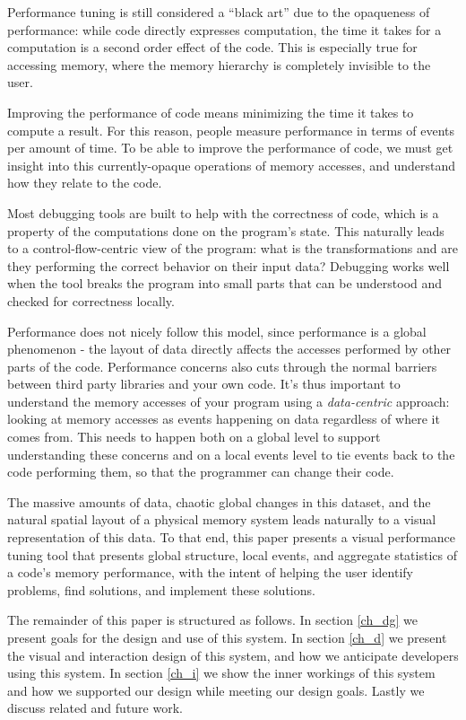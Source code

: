 \documentclass[annual]{acmsiggraph}
\begin{document}
  Performance tuning is still considered a ``black art'' due to the opaqueness of performance: while code directly expresses computation, the time it takes for a computation is a second order effect of the code. This is especially true for accessing memory, where the memory hierarchy is completely invisible to the user.
  
  Improving the performance of code means minimizing the time it takes to compute a result. For this reason, people measure performance in terms of events per amount of time. To be able to improve the performance of code, we must get insight into this currently-opaque operations of memory accesses, and understand how they relate to the code.
  
  Most debugging tools are built to help with the correctness of code, which is a property of the computations done on the program's state. This naturally leads to a control-flow-centric view of the program: what is the transformations and are they performing the correct behavior on their input data? Debugging works well when the tool breaks the program into small parts that can be understood and checked for correctness locally.
  
  Performance does not nicely follow this model, since performance is a global phenomenon - the layout of data directly affects the accesses performed by other parts of the code. Performance concerns also cuts through the normal barriers between third party libraries and your own code. It's thus important to understand the memory accesses of your program using a \emph{data-centric} approach: looking at memory accesses as events happening on data regardless of where it comes from. This needs to happen both on a global level to support understanding these concerns and on a local events level to tie events back to the code performing them, so that the programmer can change their code.
    
  The massive amounts of data, chaotic global changes in this dataset, and the natural spatial layout of a physical memory system leads naturally to a visual representation of this data. To that end, this paper presents a visual performance tuning tool that presents global structure, local events, and aggregate statistics of a code's memory performance, with the intent of helping the user identify problems, find solutions, and implement these solutions. 
  
  The remainder of this paper is structured as follows. In section \ref{ch_dg} we present goals for the design and use of this system. In section \ref{ch_d} we present the visual and interaction design of this system, and how we anticipate developers using this system. In section \ref{ch_i} we show the inner workings of this system and how we supported our design while meeting our design goals. Lastly we discuss related and future work.
    
\end{document}
